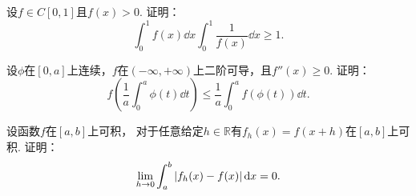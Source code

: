 \begin{example}
设\(f \in C[0,1]\)且\(f(x)>0\).
证明：\[
	\int_0^1 f(x) \dd{x}
	\int_0^1 \frac1{f(x)} \dd{x}
	\geq 1.
\]
\end{example}

\begin{example}
设\(\phi\)在\([0,a]\)上连续，\(f\)在\((-\infty,+\infty)\)上二阶可导，且\(f''(x)\geq0\).
证明：\[
	f\left(\frac1a \int_0^a \phi(t) \dd{t}\right)
	\leq \frac1a \int_0^a f(\phi(t)) \dd{t}.
\]
\end{example}

\begin{example}
设函数\(f\)在\([a,b]\)上可积，
对于任意给定\(h\in\mathbb{R}\)有\(f_h(x) = f(x+h)\)在\([a,b]\)上可积.
证明：\[
	\lim_{h\to0} \int_a^b \abs{f_h(x)-f(x)} \dd{x} = 0.
\]
\end{example}
